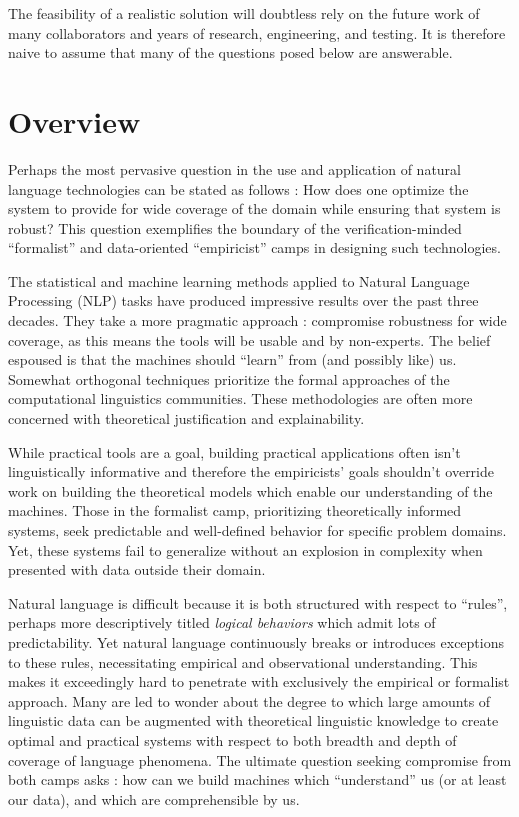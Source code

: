 \documentclass[a4paper, 11pt]{article}
\begin{document}
The feasibility of a realistic solution will doubtless rely on the future work
of many collaborators and years of research, engineering, and testing. It is
therefore naive to assume that many of the questions posed below are answerable.

\section{Overview}

Perhaps the most pervasive question in the use and application of natural
language technologies can be stated as follows : How does one optimize the
system to provide for wide coverage of the domain while ensuring that system is
robust? This question exemplifies the boundary of the verification-minded
``formalist'' and data-oriented ``empiricist'' camps in designing such
technologies.

The statistical and machine learning methods applied to Natural Language
Processing (NLP) tasks have produced impressive results over the past three decades.
They take a more pragmatic approach : compromise robustness for wide coverage,
as this means the tools will be usable and by non-experts. The belief espoused
is that the machines should ``learn'' from (and possibly like) us. Somewhat orthogonal techniques
prioritize the formal approaches of the computational linguistics communities.
These methodologies are often more concerned with theoretical justification and
explainability.

While practical tools are a goal, building practical applications often isn't
linguistically informative and therefore the empiricists' goals shouldn't
override work on building the theoretical models which enable our understanding
of the machines. Those in the formalist camp, prioritizing theoretically
informed systems, seek predictable and well-defined behavior for specific
problem domains. Yet, these systems fail to generalize without an explosion in
complexity when presented with data outside their domain.

Natural language is difficult because it is both structured with respect to
``rules'', perhaps more descriptively titled \emph{logical behaviors} which
admit lots of predictability. Yet natural language continuously breaks or
introduces exceptions to these rules, necessitating empirical and observational
understanding. This makes it exceedingly hard to penetrate with exclusively the
empirical or formalist approach. Many are led to wonder about the degree to
which large amounts of linguistic data can be augmented with theoretical
linguistic knowledge to create optimal and practical systems with respect to
both breadth and depth of coverage of language phenomena. The ultimate question
seeking compromise from both camps asks : how can we build machines which
``understand'' us (or at least our data), and which are comprehensible by us.
\end{document}
